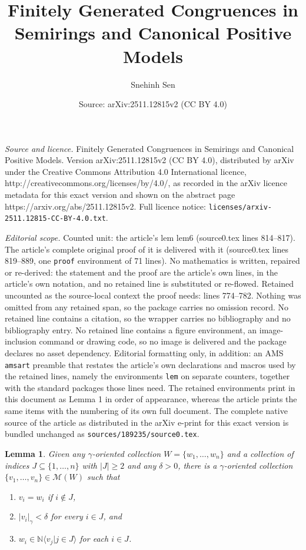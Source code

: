 \documentclass[10pt,a4paper]{amsart}
\title{Finitely Generated Congruences in Semirings and Canonical Positive Models}
\author{Snehinh Sen}
\date{Source: arXiv:2511.12815v2 (CC BY 4.0)}
\newtheorem{lem}{Lemma}
\newcommand{\N}{\mathbb{N}}
\newcommand{\cM}{\mathcal{M}}
\begin{document}
\maketitle

\noindent\emph{Source and licence.} Finitely Generated Congruences in Semirings and Canonical Positive Models. Version arXiv:2511.12815v2 (CC BY 4.0), distributed by arXiv under the Creative Commons Attribution 4.0 International licence, http://creativecommons.org/licenses/by/4.0/, as recorded in the arXiv licence metadata for this exact version and shown on the abstract page https://arxiv.org/abs/2511.12815v2. Full licence notice: \texttt{licenses/arxiv-2511.12815-CC-BY-4.0.txt}.\par\smallskip

\noindent\textit{Editorial scope.} Counted unit: the article's lem lem6 (source0.tex lines 814--817). The article's complete original proof of it is delivered with it (source0.tex lines 819--889, one \texttt{proof} environment of 71 lines). No mathematics is written, repaired or re-derived: the statement and the proof are the article's own lines, in the article's own notation, and no retained line is substituted or re-flowed.  Retained uncounted as the source-local context the proof needs: lines 774--782.  Nothing was omitted from any retained span, so the package carries no omission record.  No retained line contains a citation, so the wrapper carries no bibliography and no bibliography entry.  No retained line contains a figure environment, an image-inclusion command or drawing code, so no image is delivered and the package declares no asset dependency.  Editorial formatting only, in addition: an AMS \texttt{amsart} preamble that restates the article's own declarations and macros used by the retained lines, namely the environments \texttt{lem} on separate counters, together with the standard packages those lines need.  The retained environments print in this document as Lemma 1 in order of appearance, whereas the article prints the same items with the numbering of its own full document.  The complete native source of the article as distributed in the arXiv e-print for this exact version is bundled unchanged as \texttt{sources/189235/source0.tex}.
\begin{lem}
    \label{lem4}
    Given any $\gamma$-oriented collection $W=\{w_1,\ldots,w_n\}$ and a collection of indices $J\subseteq \{1,\ldots, n\}$ with $|J|\geq 2$ and any $\delta>0$, there is a $\gamma$-oriented collection $\{v_1,\ldots, v_n\}\in \cM(W)$ such that
    \begin{enumerate}
        \item $v_i=w_i$ if $i\notin J$,
        \item $|v_i|_\gamma < \delta $ for every $i\in J$, and
        \item $w_i \in \N\langle v_j | j\in J\rangle$ for each $i\in J$.
    \end{enumerate}
\end{lem}
\end{document}
